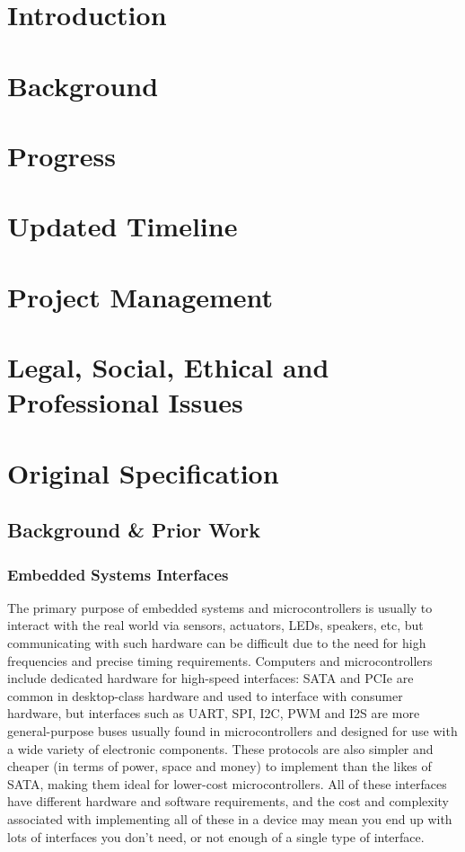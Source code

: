 \documentclass[a4paper,fleqn,12pt]{article}
\begin{document}


\pagestyle{plain}

\section{Introduction}
\section{Background}
\section{Progress}
\section{Updated Timeline}
\section{Project Management}
\section{Legal, Social, Ethical and Professional Issues}

\appendix
\section{Original Specification}

\subsection{Background \& Prior Work}

\subsubsection{Embedded Systems Interfaces}

The primary purpose of embedded systems and microcontrollers is usually to interact with the real world via sensors, actuators, LEDs, speakers, etc, but communicating with such hardware can be difficult due to the need for high frequencies and precise timing requirements. Computers and microcontrollers include dedicated hardware for high-speed interfaces: SATA and PCIe are common in desktop-class hardware and used to interface with consumer hardware, but interfaces such as UART, SPI, I2C, PWM and I2S are more general-purpose buses usually found in microcontrollers and designed for use with a wide variety of electronic components. These protocols are also simpler and cheaper (in terms of power, space and money) to implement than the likes of SATA, making them ideal for lower-cost microcontrollers. All of these interfaces have different hardware and software requirements, and the cost and complexity associated with implementing all of these in a device may mean you end up with lots of interfaces you don't need, or not enough of a single type of interface.
\end{document}
